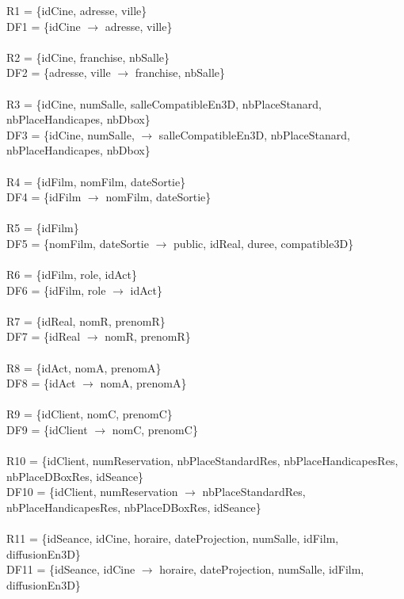\documentclass[a4paper,sffamily,12pt]{article}
\begin{document}
				\noindent R1 = \{idCine, adresse, ville\} \\  DF1 = \{idCine $\rightarrow$ adresse, ville\} \\
				\\
				R2 = \{idCine, franchise, nbSalle\} \\ DF2 = \{adresse, ville $\rightarrow$ franchise, nbSalle\} \\
				\\
				R3 = \{idCine, numSalle, salleCompatibleEn3D, nbPlaceStanard, nbPlaceHandicapes, nbDbox\} \\ DF3 = \{idCine, numSalle, $\rightarrow$ salleCompatibleEn3D, nbPlaceStanard, nbPlaceHandicapes, nbDbox\} \\
				\\
				R4 = \{idFilm, nomFilm, dateSortie\} \\ DF4 = \{idFilm $\rightarrow$ nomFilm, dateSortie\} \\
				\\
				R5 = \{idFilm\} \\ DF5 = \{nomFilm, dateSortie $\rightarrow$ public, idReal, duree, compatible3D\} \\	
				\\							
				R6 = \{idFilm, role, idAct\} \\ DF6 = \{idFilm, role $\rightarrow$  idAct\} \\
				\\
				R7 = \{idReal, nomR, prenomR\} \\ DF7 = \{idReal $\rightarrow$ nomR, prenomR\} \\
				\\
				R8 = \{idAct, nomA, prenomA\} \\ DF8 = \{idAct $\rightarrow$ nomA, prenomA\} \\
				\\
				R9 = \{idClient, nomC, prenomC\} \\ DF9 = \{idClient $\rightarrow$ nomC, prenomC\} \\ 
				\\
				R10 = \{idClient, numReservation, nbPlaceStandardRes, nbPlaceHandicapesRes, nbPlaceDBoxRes, idSeance\} \\ DF10 = \{idClient, numReservation $\rightarrow$  nbPlaceStandardRes, nbPlaceHandicapesRes, nbPlaceDBoxRes, idSeance\} \\
				\\
				R11 = \{idSeance, idCine, horaire, dateProjection, numSalle, idFilm, diffusionEn3D\} \\ DF11 = \{idSeance, idCine $\rightarrow$ horaire, dateProjection, numSalle, idFilm, diffusionEn3D\} \\
				
\end{document}
